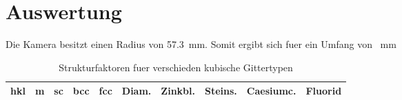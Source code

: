 \section{Auswertung}\label{sec:Auswertung}

Die Kamera besitzt einen Radius von \SI{57.3}{\milli\meter}.
Somit ergibt sich fuer ein Umfang von \SI{}{\milli\meter}

\begin{table}[h]
		\centering
		\caption{Strukturfaktoren fuer verschieden kubische Gittertypen}
		\label{tab:label}
		\begin{tabular}{c c c c c c c c c c}
				\toprule
				hkl & m & sc & bcc & fcc & Diam. & Zinkbl. & Steins. & Caesiumc. & Fluorid \\ 
				\midrule
					
				\bottomrule
		\end{tabular}
\end{table}
